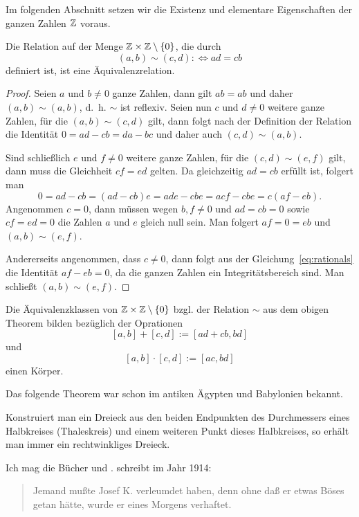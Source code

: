 Im folgenden Abschnitt setzen wir die Existenz und elementare Eigenschaften der ganzen Zahlen $\mathbb{Z}$ voraus.

\begin{thm}
  Die Relation auf der Menge $\mathbb{Z} \times \mathbb{Z} \setminus \lbrace 0 \rbrace$, die durch
  \[ (a, b) \sim (c, d) :\Leftrightarrow ad = cb \]
  definiert ist, ist eine Äquivalenzrelation.
\end{thm} 

\begin{proof}
  Seien $a$ und $b \neq 0$ ganze Zahlen, dann gilt $ab = ab$ und daher $(a, b) \sim (a, b)$, d.~h. $\sim$ ist reflexiv. Seien nun $c$ und $d \neq 0$ weitere ganze Zahlen, für die $(a, b) \sim (c, d)$ gilt, dann folgt nach der Definition der Relation die Identität $0 = ad - cb = da - bc$ und daher auch $(c, d) \sim (a, b)$.
  
  Sind schließlich $e$ und $f \neq 0$ weitere ganze Zahlen, für die $(c, d) \sim (e, f)$ gilt, dann muss die Gleichheit $cf = ed$ gelten.
  Da gleichzeitig $ad = cb$ erfüllt ist, folgert man
  \begin{equation}\label{eq:rationals}
    0 = ad - cb = (ad - cb) e = ade - cbe = acf - cbe = c (af - eb).
  \end{equation}
Angenommen $c = 0$, dann müssen wegen $b, f \neq 0$ und $ad = cb = 0$ sowie $cf = ed = 0$ die Zahlen $a$ und $e$ gleich null sein. Man folgert $af = 0 = eb$ und $(a, b) \sim (e, f)$.
  
  Andererseits angenommen, dass $c \neq 0$, dann folgt aus der Gleichung~\ref{eq:rationals} die Identität $af - eb = 0$, da die ganzen Zahlen ein Integritätsbereich sind. Man schließt $(a, b) \sim (e, f)$.
\end{proof}

\begin{thm}\label{thm:rationals}
  Die Äquivalenzklassen von $\mathbb{Z} \times \mathbb{Z} \setminus \{0\}$ bzgl. der Relation $\sim$ aus dem obigen Theorem bilden bezüglich der Oprationen 
  \[ [a, b] + [c, d] := [ad + cb, bd] \]
  und
  \[ [a, b] \cdot [c, d] := [ac, bd] \]
  einen Körper.
\end{thm}

Das folgende Theorem war schon im antiken Ägypten und Babylonien bekannt.
\begin{thm}
Konstruiert man ein Dreieck aus den beiden Endpunkten des Durchmessers eines Halbkreises (Thaleskreis) und einem weiteren Punkt dieses Halbkreises, so erhält man immer ein rechtwinkliges Dreieck.
\end{thm}

Ich mag die Bücher \cite[]{kafka2015prozess} und \cite{AC02615918}. \textcite[S. 1]{kafka2015prozess} schreibt im Jahr 1914:
\begin{quote}
Jemand mußte Josef K. verleumdet haben, denn ohne daß er etwas Böses getan hätte, wurde er eines Morgens verhaftet.
\end{quote}
